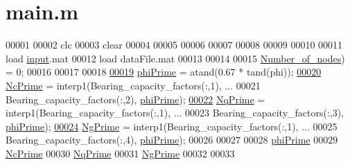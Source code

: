 \hypertarget{GeoTech_2BC_2main_8m_source}{}\section{main.\+m}
\label{GeoTech_2BC_2main_8m_source}

\begin{DoxyCode}
00001 %
00002 clc
00003 clear
00004 
00005 %
00006 
00007 %
00008 %
00009 %
00010 
00011 load \hyperlink{namespaceinput}{input}.mat
00012 load dataFile.mat
00013 
00014 %
00015 %
      \hyperlink{L01_2main_8m_a1d65c23ed4744bf98747671b08490b5c}{Number\_of\_nodes}) = 0;
00016 
00017 %
00018 
\hypertarget{GeoTech_2BC_2main_8m_source_l00019}{}\hyperlink{GeoTech_2BC_2main_8m_a430c21324a0c2608090a5bb4e98d093c}{00019} \hyperlink{GeoTech_2BC_2main_8m_a430c21324a0c2608090a5bb4e98d093c}{phiPrime} = atand(0.67 * tand(phi));
\hypertarget{GeoTech_2BC_2main_8m_source_l00020}{}\hyperlink{GeoTech_2BC_2main_8m_aae2972ba47d756535fc8fa0206dd7d53}{00020} \hyperlink{GeoTech_2BC_2main_8m_aae2972ba47d756535fc8fa0206dd7d53}{NcPrime} = interp1(Bearing\_capacity\_factors(:,1), ...
00021   Bearing\_capacity\_factors(:,2), \hyperlink{GeoTech_2BC_2main_8m_a430c21324a0c2608090a5bb4e98d093c}{phiPrime});
\hypertarget{GeoTech_2BC_2main_8m_source_l00022}{}\hyperlink{GeoTech_2BC_2main_8m_ade3072591b86caf4be69b3a9c353f213}{00022} \hyperlink{GeoTech_2BC_2main_8m_ade3072591b86caf4be69b3a9c353f213}{NqPrime} = interp1(Bearing\_capacity\_factors(:,1), ...
00023   Bearing\_capacity\_factors(:,3), \hyperlink{GeoTech_2BC_2main_8m_a430c21324a0c2608090a5bb4e98d093c}{phiPrime});
\hypertarget{GeoTech_2BC_2main_8m_source_l00024}{}\hyperlink{GeoTech_2BC_2main_8m_a1cbfb427d0fd236ae4446fb44e5b64d1}{00024} \hyperlink{GeoTech_2BC_2main_8m_a1cbfb427d0fd236ae4446fb44e5b64d1}{NgPrime} = interp1(Bearing\_capacity\_factors(:,1), ...
00025   Bearing\_capacity\_factors(:,4), \hyperlink{GeoTech_2BC_2main_8m_a430c21324a0c2608090a5bb4e98d093c}{phiPrime});
00026   
00027 %
00028 \hyperlink{GeoTech_2BC_2main_8m_a430c21324a0c2608090a5bb4e98d093c}{phiPrime}
00029 \hyperlink{GeoTech_2BC_2main_8m_aae2972ba47d756535fc8fa0206dd7d53}{NcPrime}
00030 \hyperlink{GeoTech_2BC_2main_8m_ade3072591b86caf4be69b3a9c353f213}{NqPrime}
00031 \hyperlink{GeoTech_2BC_2main_8m_a1cbfb427d0fd236ae4446fb44e5b64d1}{NgPrime}
00032 
00033 %
\end{DoxyCode}
